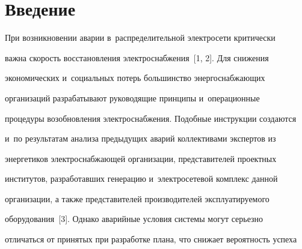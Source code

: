    























      \thispagestyle{headings}


      


      \vspace*{-16pt} 





\section{Введение}





  При возникновении аварии в~распределительной электросети критически 


важна скорость восстановления электроснабжения~[1, 2]. Для снижения 


экономических и~социальных потерь большинство энергоснабжающих 


организаций разрабатывают руководящие принципы и~операционные 


процедуры возобновления электроснабжения. Подобные инструкции создаются 


и~по результатам анализа предыдущих аварий коллективами экспертов из 


энергетиков электроснабжающей организации, представителей проектных 


институтов, разработавших генерацию и~электросетевой комплекс данной 


организации, а также представителей производителей эксплуатируемого 


оборудования~[3]. Однако аварийные условия системы могут серьезно 


отличаться от принятых при разработке плана, что снижает вероятность успеха 


